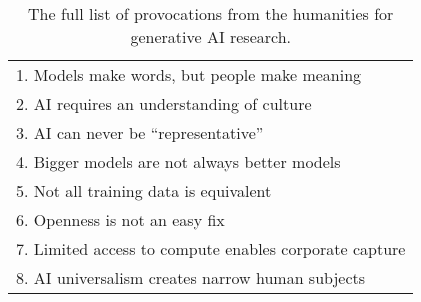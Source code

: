 
\begin{table}[h]
    \centering
    \footnotesize
    \begin{tabular}{l}
        1. Models make words, but people make meaning  \\
        2. AI requires an understanding of culture \\
        3. AI can never be ``representative'' \\
        4. Bigger models are not always better models \\
        5. Not all training data is equivalent \\
        6. Openness is not an easy fix \\
        7. Limited access to compute enables corporate capture \\
        8. AI universalism creates narrow human subjects \\
    \end{tabular}
    \vspace{0.2cm}
    \caption{The full list of provocations from the humanities for generative AI research.}
    \label{table:provocations-list}
\end{table}